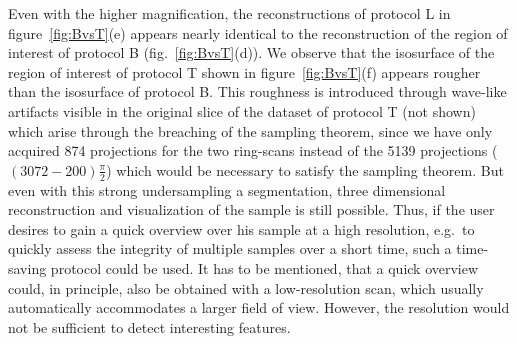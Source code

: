 Even with the higher magnification, the reconstructions of protocol L in figure~\ref{fig:BvsT}(e) appears nearly identical to the reconstruction of the region of interest of protocol B (fig.~\ref{fig:BvsT}(d)). We observe that the isosurface of the region of interest of protocol T shown in figure~\ref{fig:BvsT}(f) appears rougher than the isosurface of protocol B. This roughness is introduced through wave-like artifacts visible in the original slice of the dataset of protocol T (not shown) which arise through the breaching of the sampling theorem, since we have only acquired 874 projections for the two ring-scans instead of the 5139 projections ($(3072-200)\frac{\pi}{2}$) which would be necessary to satisfy the sampling theorem. But even with this strong undersampling a segmentation, three dimensional reconstruction and visualization of the sample is still possible. Thus, if the user desires to gain a quick overview over his sample at a high resolution, e.g.\ to quickly assess the integrity of multiple samples over a short time, such a time-saving protocol could be used. It has to be mentioned, that a quick overview could, in principle, also be obtained with a low-resolution scan, which usually automatically accommodates a larger field of view. However, the resolution would not be sufficient to detect interesting features.

